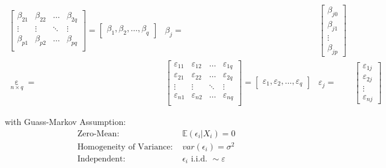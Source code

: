 \begin{subequations}
\begin{align}
\begin{bmatrix}
        \beta _{21}&\beta _{22}&\ldots&\beta _{2q}\\
        \vdots&\vdots&\ddots&\vdots\\
        \beta _{p1}&\beta _{p2}&\ldots&\beta _{pq}\\
        \end{bmatrix} =\begin{bmatrix}
            \beta _1,\beta _2,\ldots,\beta _q
        \end{bmatrix}
        & \beta _j=&\begin{bmatrix}
            \beta _{j0}\\
            \beta_{j1}\\
            \vdots\\
            \beta_{jp}
        \end{bmatrix}\\
        \mathop{\varepsilon }\limits_{n\times q} =&
        \begin{bmatrix}
        \varepsilon _{11}&\varepsilon _{12}&\ldots&\varepsilon _{1q}\\
        \varepsilon _{21}&\varepsilon _{22}&\ldots&\varepsilon _{2q}\\
        \vdots&\vdots&\ddots&\vdots\\
        \varepsilon _{n1}&\varepsilon _{n2}&\ldots&\varepsilon _{nq}\\
        \end{bmatrix}=
        \begin{bmatrix}
            \varepsilon _1,\varepsilon _2,\ldots,\varepsilon _q
        \end{bmatrix}
        &
        \varepsilon _j=&\begin{bmatrix}
                \varepsilon _{1j}\\
                \varepsilon _{2j}\\
                \vdots\\
                \varepsilon _{nj}
            \end{bmatrix}
    \end{align}
\end{subequations}

with Guass-Markov Assumption:
\begin{equation}\label{EqaGaussMarkovAssumption}
    \begin{aligned}
        \text{Zero-Mean: }&\mathbb{E}(\epsilon_i|X_i)=0 \\
        \text{Homogeneity of Variance: }&var(\epsilon_i)=\sigma^2\\
        \text{Independent: }&\epsilon_i\text{ i.i.d. }\sim \varepsilon
    \end{aligned}
\end{equation}

